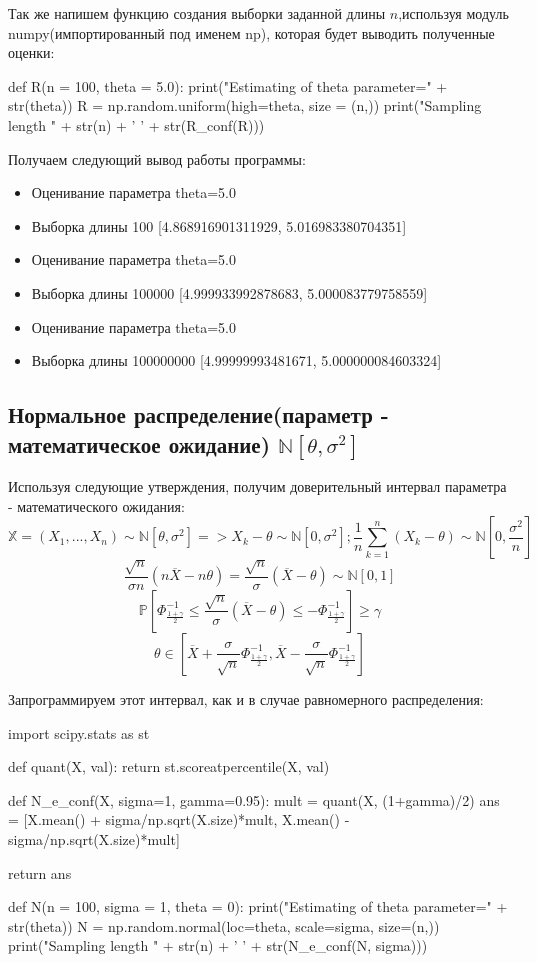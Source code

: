 \documentclass{article}
\begin{document}
Так же напишем функцию создания выборки заданной длины $n$,используя модуль numpy(импортированный под именем np), которая будет выводить полученные оценки:

\begin{python}
def R(n = 100, theta = 5.0):
	print("Estimating of theta parameter=" + str(theta))
	R = np.random.uniform(high=theta, size = (n,))
	print("Sampling length " + str(n) + ' ' + str(R_conf(R)))	
\end{python}

Получаем следующий вывод работы программы:

\begin{itemize}
	\item Оценивание параметра theta=5.0
	\item Выборка длины 100 [4.868916901311929, 5.016983380704351]
	\item Оценивание параметра theta=5.0
	\item Выборка длины 100000 [4.999933992878683, 5.000083779758559]
	\item Оценивание параметра theta=5.0
	\item Выборка длины 100000000 [4.99999993481671, 5.000000084603324]
\end{itemize}

\subsection{Нормальное распределение(параметр - математическое ожидание) $\mathbb{N}\left[\theta, \sigma^2\right]$}

Используя следующие утверждения, получим доверительный интервал параметра - математического ожидания:
\[\mathbb{X}=\left(X_1, ..., X_n\right) \sim \mathbb{N}[\theta, \sigma^2] => X_k-\theta \sim \mathbb{N}[0, \sigma^2]; \frac{1}{n}\sum_{k=1}^{n}\left(X_k-\theta\right)\sim\mathbb{N}\left[0, \frac{\sigma^2}{n}\right]\]
\[\frac{\sqrt{n}}{\sigma n}\left(n\overline{X}-n\theta\right) = \frac{\sqrt{n}}{\sigma}\left(\overline{X}-\theta\right)\sim \mathbb{N}[0, 1]\]
\[\mathbb{P}\left[\Phi^{-1}_{\frac{1+\gamma}{2}}\le\frac{\sqrt{n}}{\sigma}\left(\overline{X}-\theta\right)\le-\Phi^{-1}_{\frac{1+\gamma}{2}}\right]\ge\gamma\]
\[\theta \in \left[\overline{X}+\frac{\sigma}{\sqrt{n}}\Phi^{-1}_{\frac{1+\gamma}{2}}, \overline{X}-\frac{\sigma}{\sqrt{n}}\Phi^{-1}_{\frac{1+\gamma}{2}}\right]\]

Запрограммируем этот интервал, как и в случае равномерного распределения:
\begin{python}
import scipy.stats as st

def quant(X, val):
	return st.scoreatpercentile(X, val)

def N_e_conf(X, sigma=1, gamma=0.95):
	mult = quant(X, (1+gamma)/2)
	ans = [X.mean() + sigma/np.sqrt(X.size)*mult, X.mean() - sigma/np.sqrt(X.size)*mult]

	return ans

def N(n = 100, sigma = 1, theta = 0):
	print("Estimating of theta parameter=" + str(theta))
	N = np.random.normal(loc=theta, scale=sigma, size=(n,))
	print("Sampling length " + str(n) + ' ' + 
		str(N_e_conf(N, sigma)))
\end{python}
\end{document}
